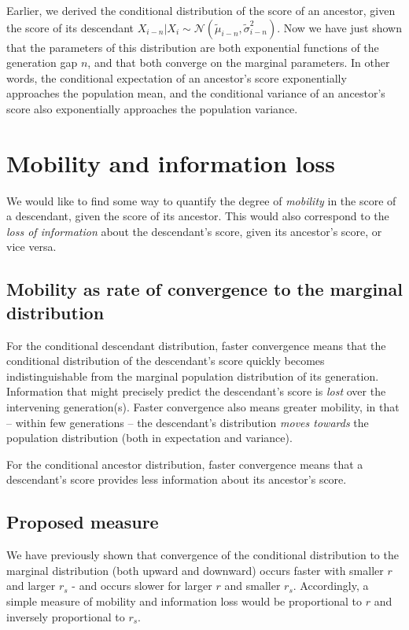 \documentclass[letterpaper,10pt]{article} %
\begin{document}
Earlier, we derived the conditional distribution of the score of an ancestor, given the score of its descendant $X_{i-n}|X_i \sim \mathcal{N}( \tilde{\mu}_{i-n}, \tilde{\sigma}_{i-n}^2)$. Now we have just shown that the parameters of this distribution are both exponential functions of the generation gap $n$, and that both converge on the marginal parameters. In other words, the conditional expectation of an ancestor's score exponentially approaches the population mean, and the conditional variance of an ancestor's score also exponentially approaches the population variance. 



\section{Mobility and information loss}

We would like to find some way to quantify the degree of \emph{mobility} in the score of a descendant, given the score of its ancestor. This would also correspond to the \emph{loss of information} about the descendant's score, given its ancestor's score, or vice versa.

\subsection{Mobility as rate of convergence to the marginal distribution}
For the conditional descendant distribution, faster convergence means that the conditional distribution of the descendant's score quickly becomes indistinguishable from the marginal population distribution of its generation. Information that might precisely predict the descendant's score is \emph{lost} over the intervening generation(s). Faster convergence also means greater mobility, in that -- within few generations -- the descendant's distribution \emph{moves towards} the population distribution (both in expectation and variance). 

For the conditional ancestor distribution, faster convergence means that a descendant's score provides less information about its ancestor's score. 

\subsection{Proposed measure}
We have previously shown that convergence of the conditional distribution to the marginal distribution (both upward and downward) occurs faster with smaller $r$ and larger $r_s$ - and occurs slower for larger $r$ and smaller $r_s$. Accordingly, a simple measure of mobility and information loss would be proportional to $r$ and inversely proportional to $r_s$. 
\end{document}
